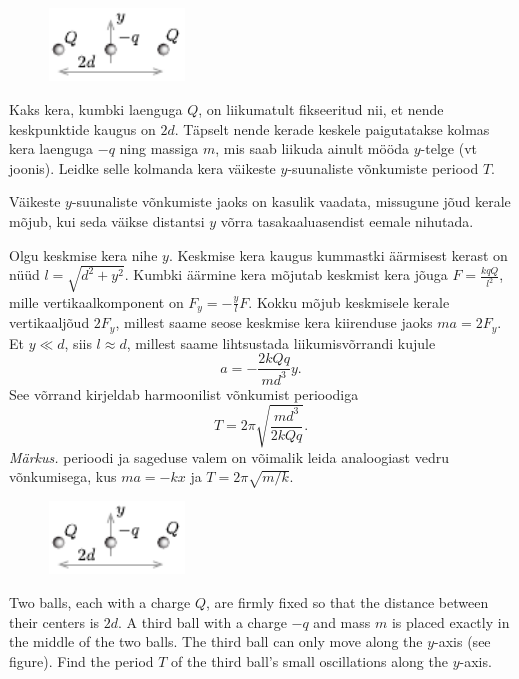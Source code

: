 
\begin{figure}
	\vspace{-25pt}
	\begin{center}
		\includegraphics[width=0.32\textwidth]{2017-v2g-09-laengudjoonis.pdf}
	\end{center}
	\vspace{-10pt}
\end{figure}

Kaks kera, kumbki laenguga $Q$, on liikumatult fikseeritud nii, et nende keskpunktide kaugus on $2d$. Täpselt nende kerade keskele paigutatakse kolmas kera laenguga $-q$ ning massiga $m$, mis saab liikuda ainult mööda $y$-telge (vt joonis). Leidke selle kolmanda kera väikeste $y$-suunaliste võnkumiste periood $T$.

\hint
Väikeste $y$-suunaliste võnkumiste jaoks on kasulik vaadata, missugune jõud kerale mõjub, kui seda väikse distantsi $y$ võrra tasakaaluasendist eemale nihutada.

\solu
Olgu keskmise kera nihe $y$. Keskmise kera kaugus kummastki äärmisest kerast on nüüd $l=\sqrt{d^2+y^2}$. Kumbki äärmine kera mõjutab keskmist kera jõuga $F=\frac{kqQ}{l^2}$, mille vertikaalkomponent on $F_y=-\frac{y}{l}F$. Kokku mõjub keskmisele kerale vertikaaljõud $2F_y$, millest saame seose keskmise kera kiirenduse jaoks $ma=2F_y$. Et $y\ll d$, siis $l\approx d$, millest saame lihtsustada liikumisvõrrandi kujule
\[
a=-\frac{2kQq}{md^3}y.
\]
See võrrand kirjeldab harmoonilist võnkumist perioodiga 
\[ T = 2\pi \sqrt{\frac{md^3}{2kQq}}.\]
{\em Märkus.} perioodi ja sageduse valem on võimalik leida analoogiast vedru võnkumisega, kus $ma = -kx$ ja $T=2\pi \sqrt{m/k}$.

\begin{figure}
	\vspace{-25pt}
	\begin{center}
		\includegraphics[width=0.32\textwidth]{2017-v2g-09-laengudjoonis}
	\end{center}
	\vspace{-10pt}
\end{figure}
Two balls, each with a charge $Q$, are firmly fixed so that the distance between their centers is $2d$. A third ball with a charge $-q$ and mass $m$ is placed exactly in the middle of the two balls. The third ball can only move along the $y$-axis (see figure). Find the period $T$ of the third ball’s small oscillations along the $y$-axis.

